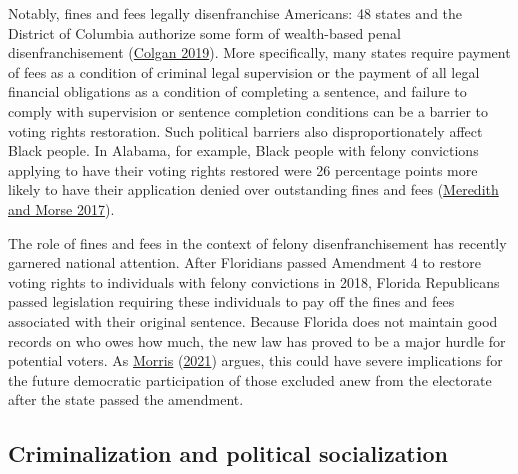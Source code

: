 \documentclass[
  12pt,
]{article}
\begin{document}
Notably, fines and fees legally disenfranchise Americans: 48 states and the District of Columbia authorize some form of wealth-based penal disenfranchisement (\protect\hyperlink{ref-Colgan2019}{Colgan 2019}). More specifically, many states require payment of fees as a condition of criminal legal supervision or the payment of all legal financial obligations as a condition of completing a sentence, and failure to comply with supervision or sentence completion conditions can be a barrier to voting rights restoration. Such political barriers also disproportionately affect Black people. In Alabama, for example, Black people with felony convictions applying to have their voting rights restored were 26 percentage points more likely to have their application denied over outstanding fines and fees (\protect\hyperlink{ref-Meredith2017}{Meredith and Morse 2017}).

The role of fines and fees in the context of felony disenfranchisement has recently garnered national attention. After Floridians passed Amendment 4 to restore voting rights to individuals with felony convictions in 2018, Florida Republicans passed legislation requiring these individuals to pay off the fines and fees associated with their original sentence. Because Florida does not maintain good records on who owes how much, the new law has proved to be a major hurdle for potential voters. As \protect\hyperlink{ref-Morris2021}{Morris} (\protect\hyperlink{ref-Morris2021}{2021}) argues, this could have severe implications for the future democratic participation of those excluded anew from the electorate after the state passed the amendment.

\hypertarget{criminalization-and-political-socialization}{%
\subsection*{Criminalization and political socialization}\label{criminalization-and-political-socialization}}
\end{document}
